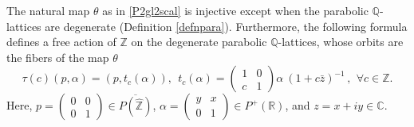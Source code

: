 \documentclass[graybox, envcountsect%
]{svmult}
\def\C{{\mathbb C}}
\def\Q{{\mathbb Q}}
\def\R{{\mathbb R}}
\def\Z{{\mathbb Z}}
\def\qqq{\,,\,~\forall}
\begin{document}
\begin{proposition}\label{comparescal}
 	The natural map $\theta$ as in \eqref{P2gl2scal} 
 	is injective except when the parabolic $\Q$-lattices are degenerate (Definition \ref{defnpara}). Furthermore, the following formula defines a free action of $\Z$ on the degenerate parabolic $\Q$-lattices, whose orbits are the fibers of the map $\theta$
 	\begin{equation}\label{P2gl2scal1}
\tau(c)(p,\alpha)=(p,t_c(\alpha)), \ \ 	t_c(\alpha)=\begin{pmatrix} 1 &0 \\
c &1 \end{pmatrix}\alpha\ (1+c\bar z)^{-1}\qqq c\in \Z.\end{equation}
Here, $p=\begin{pmatrix} 0 &0 \\
0 &1 \end{pmatrix}\in \overline{P(\hat \Z)}$, $\alpha=\begin{pmatrix} y &x \\
0 &1 \end{pmatrix}\in P^+(\R)$, and $z=x+iy\in \C$.
 \end{proposition}
\end{document}
